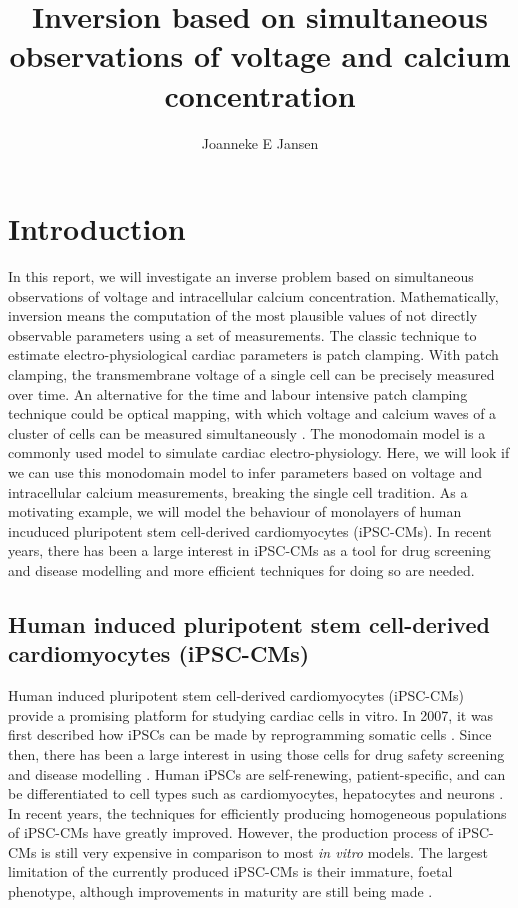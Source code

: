 \documentclass[12pt,a4paper]{article}
\title{Inversion based on simultaneous observations of voltage and calcium concentration}
\author{Joanneke E Jansen}
\begin{document}
\maketitle
\section{Introduction} \label{Introduction}
In this report, we will investigate an inverse problem based on simultaneous observations of voltage and intracellular calcium concentration. Mathematically, inversion means the computation of the most plausible values of not directly observable parameters using a set of measurements. The classic technique to estimate electro-physiological cardiac parameters is patch clamping. With patch clamping, the transmembrane voltage of a single cell can be precisely measured over time. An alternative for the time and labour intensive patch clamping technique could be optical mapping, with which voltage and calcium waves of a cluster of cells can be measured simultaneously \cite{Lee2012}. The monodomain model is a commonly used model to simulate cardiac electro-physiology. Here, we will look if we can use this monodomain model to infer parameters based on voltage and intracellular calcium measurements, breaking the single cell tradition. As a motivating example, we will model the behaviour of monolayers of human incuduced pluripotent stem cell-derived cardiomyocytes (iPSC-CMs). In recent years, there has been a large interest in iPSC-CMs as a tool for drug screening and disease modelling and more efficient techniques for doing so are needed.

\subsection{Human induced pluripotent stem cell-derived cardiomyocytes (iPSC-CMs)}
Human induced pluripotent stem cell-derived cardiomyocytes (iPSC-CMs) provide a promising platform for studying cardiac cells in vitro. In 2007, it was first described how iPSCs can be made by reprogramming somatic cells \cite{Takahashi2007}. Since then, there has been a large interest in using those cells for drug safety screening and disease modelling \cite{Sallam2016}. Human iPSCs are self-renewing, patient-specific, and can be differentiated to cell types such as cardiomyocytes, hepatocytes and neurons \cite{Rajamohan2013}. In recent years, the techniques for efficiently producing homogeneous populations of iPSC-CMs  have greatly improved. However, the production process of iPSC-CMs is still very expensive in comparison to most \textit{in vitro} models. The largest limitation of the currently produced iPSC-CMs is their immature, foetal phenotype, although improvements in maturity are still being made \cite{Denning2016}. 
\end{document}
